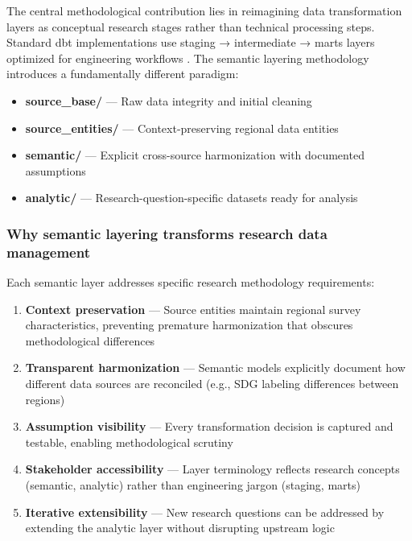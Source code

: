 \documentclass{article}
\begin{document}
The central methodological contribution lies in reimagining data transformation layers as conceptual research stages rather than technical processing steps. Standard dbt implementations use staging → intermediate → marts layers optimized for engineering workflows \cite{dbt_docs_structure}. The semantic layering methodology introduces a fundamentally different paradigm:

\begin{itemize}
    \item \textbf{source\_base/} — Raw data integrity and initial cleaning
    \item \textbf{source\_entities/} — Context-preserving regional data entities
    \item \textbf{semantic/} — Explicit cross-source harmonization with documented assumptions
    \item \textbf{analytic/} — Research-question-specific datasets ready for analysis
\end{itemize}

\subsubsection{Why semantic layering transforms research data management}
\label{subsubsec:semantic-benefits}

Each semantic layer addresses specific research methodology requirements:

\begin{enumerate}
    \item \textbf{Context preservation} — Source entities maintain regional survey characteristics, preventing premature harmonization that obscures methodological differences
    \item \textbf{Transparent harmonization} — Semantic models explicitly document how different data sources are reconciled (e.g., SDG labeling differences between regions)
    \item \textbf{Assumption visibility} — Every transformation decision is captured and testable, enabling methodological scrutiny
    \item \textbf{Stakeholder accessibility} — Layer terminology reflects research concepts (semantic, analytic) rather than engineering jargon (staging, marts)
    \item \textbf{Iterative extensibility} — New research questions can be addressed by extending the analytic layer without disrupting upstream logic
\end{enumerate}
\end{document}
